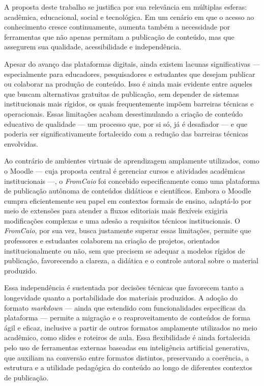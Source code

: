 A proposta deste trabalho se justifica por sua relevância em múltiplas esferas: acadêmica, educacional, social e tecnológica. Em um cenário em que o acesso ao conhecimento cresce continuamente, aumenta também a necessidade por ferramentas que não apenas permitam a publicação de conteúdo, mas que assegurem sua qualidade, acessibilidade e independência.

Apesar do avanço das plataformas digitais, ainda existem lacunas significativas — especialmente para educadores, pesquisadores e estudantes que desejam publicar ou colaborar na produção de conteúdo. Isso é ainda mais evidente entre aqueles que buscam alternativas gratuitas de publicação, sem depender de sistemas institucionais mais rígidos, os quais frequentemente impõem barreiras técnicas e operacionais. Essas limitações acabam desestimulando a criação de conteúdo educativo de qualidade — um processo que, por si só, já é desafiador — e que poderia ser significativamente fortalecido com a redução das barreiras técnicas envolvidas.


Ao contrário de ambientes virtuais de aprendizagem amplamente utilizados, como o Moodle — cuja proposta central é gerenciar cursos e atividades acadêmicas institucionais —, o \textit{FromCaio} foi concebido especificamente como uma plataforma de publicação autônoma de conteúdos didáticos e científicos. Embora o Moodle cumpra eficientemente seu papel em contextos formais de ensino, adaptá-lo por meio de extensões para atender a fluxos editoriais mais flexíveis exigiria modificações complexas e uma adesão a requisitos técnicos institucionais. O \textit{FromCaio}, por sua vez, busca justamente superar essas limitações, permite que professores e estudantes colaborem na criação de projetos, orientados institucionalmente ou não, sem que precisem se adequar a modelos rígidos de publicação, favorecendo a clareza, a didática e o controle autoral sobre o material produzido.

Essa independência é sustentada por decisões técnicas que favorecem tanto a longevidade quanto a portabilidade dos materiais produzidos. A adoção do formato \textit{markdown} — ainda que estendido com funcionalidades específicas da plataforma — permite a migração e o reaproveitamento de conteúdos de forma ágil e eficaz, inclusive a partir de outros formatos amplamente utilizados no meio acadêmico, como slides e roteiros de aula. Essa flexibilidade é ainda fortalecida pelo uso de ferramentas externas baseadas em inteligência artificial generativa, que auxiliam na conversão entre formatos distintos, preservando a coerência, a estrutura e a utilidade pedagógica do conteúdo ao longo de diferentes contextos de publicação.

